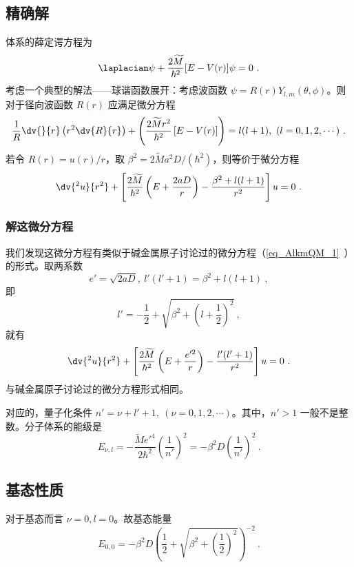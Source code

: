 \subsection{精确解}
体系的薛定谔方程为
\begin{equation}
\laplacian \psi + \frac{2 \widetilde M}{\hbar^2} [E - V(r)] \psi = 0~.
\end{equation}
考虑一个典型的解法——球谐函数展开：考虑波函数 $\psi = R(r) Y_{l, m} (\theta, \phi)$。则对于径向波函数 $R(r)$ 应满足微分方程
\begin{equation}
\frac1R \dv{}{r}\left(r^2 \dv{R}{r}\right) + \left( \frac{2\widetilde M r^2}{\hbar^2} \left[E-V(r)\right] \right) = l(l+1), \ (l = 0, 1, 2, \cdots) ~.
\end{equation}
若令 $R(r) = u(r)/r$，取 $\beta^2=2\widetilde M a^2 D/(\hbar^2)$，则等价于微分方程
\begin{equation}
\dv{^2 u}{r^2} + \left[\frac{2\widetilde M}{\hbar^2} \left(E + \frac{2aD}{r}\right) - \frac{\beta^2 + l(l+1)}{r^2}\right] u = 0 ~.
\end{equation}

\subsubsection{解这微分方程}
我们发现这微分方程有类似于碱金属原子讨论过的微分方程（\autoref{eq_AlkmQM_1}~）的形式。取两系数
\begin{equation}
e' = \sqrt{2aD},\ l'(l'+1) = \beta^2 + l(l+1) ~,
\end{equation}
即
$$l' = -\frac12 + \sqrt{\beta^2 + \left(l + \frac12\right)^2} ~,$$
就有
\begin{equation}
\dv{^2 u}{r^2} + \left[ \frac{2 \widetilde M}{\hbar^2} \left(E + \frac{e'^2}{r}\right)  - \frac{l'(l'+1)}{r^2}\right] u = 0 ~.
\end{equation}
与碱金属原子讨论过的微分方程形式相同。

对应的，量子化条件 $n' = \nu + l' + 1, \ (\nu = 0, 1, 2, \cdots)$。其中，$n' > 1$ 一般不是整数。分子体系的能级是
\begin{equation}
E_{\nu, l} = -\frac{\widetilde M e'^4}{2 \hbar^2} \left(\frac1{n'}\right)^2 = -\beta^2 D \left(\frac{1}{n'}\right)^2 ~.
\end{equation}

\subsection{基态性质}
对于基态而言 $\nu=0, l=0$。故基态能量
\begin{equation}
E_{0, 0} = -\beta^2 D \left(\frac12 + \sqrt{\beta^2 + \left(\frac12\right)^2}\right)^{-2} ~.
\end{equation}


